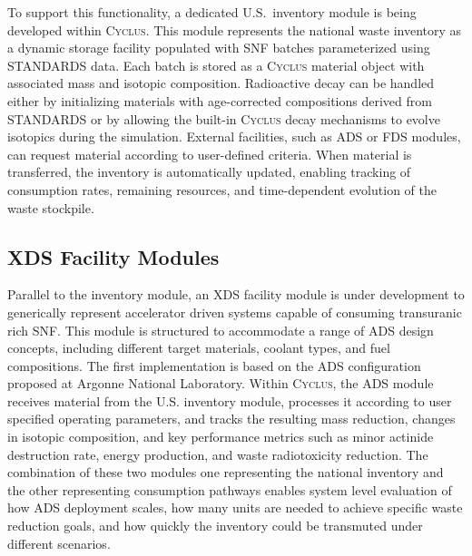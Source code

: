     To support this functionality, a dedicated U.S.\ inventory module is being developed within \textsc{Cyclus}.
    This module represents the national waste inventory as a dynamic storage facility populated with \gls{SNF} batches parameterized
    using STANDARDS data. Each batch is stored as a \textsc{Cyclus} material object with associated mass and isotopic composition.
    Radioactive decay can be handled either by initializing materials with age-corrected compositions derived from STANDARDS or
    by allowing the built-in \textsc{Cyclus} decay mechanisms to evolve isotopics during the simulation.
    External facilities, such as \gls{ADS} or \gls{FDS} modules, can request material according to user-defined criteria.
    When material is transferred, the inventory is automatically updated, enabling tracking of consumption rates, remaining resources,
    and time-dependent evolution of the waste stockpile.


    \subsection{\gls{XDS} Facility Modules}

    Parallel to the inventory module, an \gls{XDS} facility module is under development to generically represent accelerator driven systems
    capable of consuming transuranic rich \gls{SNF}. This module is structured to accommodate a range of \gls{ADS} design concepts,
    including different target materials, coolant types, and fuel compositions. The first implementation is based on the
    \gls{ADS} configuration proposed at Argonne National Laboratory. Within \textsc{Cyclus}, the \gls{ADS} module receives material from the
    U.S. inventory module, processes it according to user specified operating parameters, and tracks the resulting mass reduction,
    changes in isotopic composition, and key performance metrics such as minor actinide destruction rate, energy production,
    and waste radiotoxicity reduction. The combination of these two modules one representing the national inventory and
    the other representing consumption pathways enables system level evaluation of how \gls{ADS} deployment scales, how many
    units are needed to achieve specific waste reduction goals, and how quickly the inventory could be transmuted under different scenarios\cite{herrera-martinez_transmutation_2007}.


